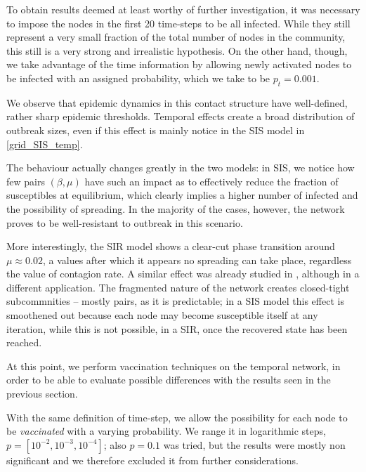 \documentclass[a4paper,11pt, twocolumn]{article}
\begin{document}
To obtain results deemed at least worthy of further investigation, it was necessary to impose the nodes in the first 20 time-steps to be all infected. While they still represent a very small fraction of the total number of nodes in the community, this still is a very strong and irrealistic hypothesis. On the other hand, though, we take advantage of the time information by allowing newly activated nodes to be infected with an assigned probability, which we take to be $p_t = 0.001$. %

We observe that epidemic dynamics in this contact structure have well-defined, rather sharp epidemic thresholds. Temporal effects create a broad distribution of outbreak sizes, even if this effect is mainly notice in the SIS model in \ref{grid_SIS_temp}.

The behaviour actually changes greatly in the two models: in SIS, we notice how few pairs $(\beta,\mu)$ have such an impact as to effectively reduce the fraction of susceptibles at equilibrium, which clearly implies a higher number of infected and the possibility of spreading. In the majority of the cases, however, the network proves to be well-resistant to outbreak in this scenario.

More interestingly, the SIR model shows a clear-cut phase transition around $\mu \approx 0.02$, a values after which it appears no spreading can take place, regardless the value of contagion rate. A similar effect was already studied in \cite{rochabis2}, although in a different application. The fragmented nature of the network creates closed-tight subcommnities -- mostly pairs, as it is predictable; in a SIS model this effect is smoothened out because each node may become susceptible itself at any iteration, while this is not possible, in a SIR, once the recovered state has been reached.

At this point, we perform vaccination techniques on the temporal network, in order to be able to evaluate possible differences with the results seen in the previous section.

With the same definition of time-step, we allow the possibility for each node to be \emph{vaccinated} with a varying probability. We range it in logarithmic steps, $p=[10^{-2},10^{-3},10^{-4}]$; also $p=0.1$ was tried, but the results were mostly non significant and we therefore excluded it from further considerations.
\end{document}
